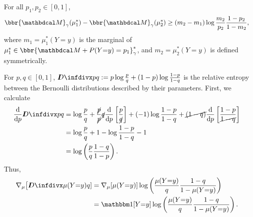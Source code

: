 \begin{lemma} \label{lem:score-gradient-bound}
    For all $p_1, p_2 \in [0,1]$,
    \[
        \bbr{\dg M}_\gamma(\mu_1^*) - \bbr{\dg M}_\gamma(\mu_2^*)
            \ge (m_2 - m_1) \log \frac{m_2}{p_2} \frac{1-p_2}{1-m_2},
    \]
    where
    $m_1 = \mu_1^*(Y{=}y)$ is the marginal of $\mu_1^* \in \bbr{\dg M + \Pr(Y{=}y) = p_1}^*_\gamma$,
    and $m_2 = \mu_2^*(Y{=}y)$ is defined symmetrically.
\end{lemma}
\begin{lproof}
    For $p, q \in [0,1]$, $\kldiv pq := p \log \frac{p}{q} + (1-p) \log \frac{1-p}{1-q}$ is the relative entropy between the Bernoulli distributions described by their parameters.
    First, we calculate
    \begin{align*}
        \frac{\mathrm d}{\mathrm d p} \kldiv{p}{q}
        &= \log \frac{p}{q} + \frac{\Cancel{p}}{\Cancel{p}} \Cancel{q} \frac{\mathrm d}{\mathrm dp} \left[ \frac{p}{\Cancel{q}} \right]
        + (-1) \log \frac{1-p}{1-q} + \Cancel{(1-q)} \frac{\mathrm d}{\mathrm d p}\left[\frac{1-p}{\Cancel{1-q}}\right] \\
        &= \log \frac pq + 1 - \log \frac{1-p}{1-q} -1  \\
        &= \log \left( \frac{p}{q} \frac{1-q}{1-p} \right).
    \end{align*}
    Thus,
    \begin{align*}
        \nabla_\mu \big[ \kldiv {\mu(Y{=}y)}{q} ]
        &= \nabla_\mu[ \mu(Y{=}y) ] \log \left( \frac{\mu(Y{=}y)}{q} \frac{1-q}{1-\mu(Y{=}y)} \right) \\
        &= \mathbbm1[Y{=}y] \log \left( \frac{\mu(Y{=}y)}{q} \frac{1-q}{1-\mu(Y{=}y)} \right).
    \end{align*}


\end{lproof}
